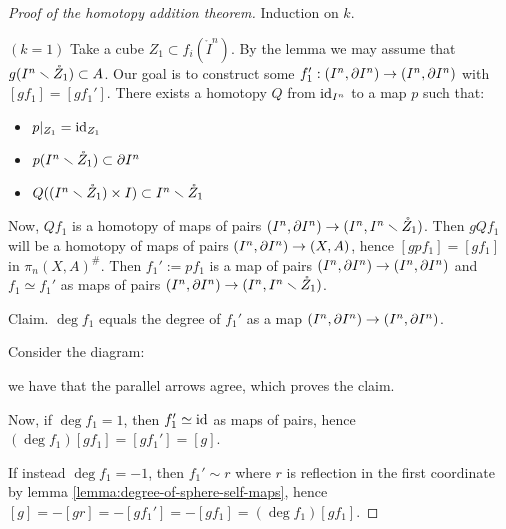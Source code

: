 \begin{proof}[Proof of the homotopy addition theorem]\renewcommand{\qedsymbol}{\textit{To be continued...}} Induction on $k$.

$(k=1)$ Take a cube $Z_1\subset f_i(\mathring{I}^n)$. By the lemma we may assume that $g(I^n\smallsetminus\mathring{Z}_1)\subset A$. Our goal is to construct some $f_1':(I^n,\partial I^n)\to(I^n,\partial I^n)$ with $[gf_1]=[gf_1']$. There exists\normalmarginpar{} a homotopy $Q$ from $\operatorname{id}_{I^n}$ to a map $p$ such that:
\begin{itemize}
    \item $p|_{Z_1}=\operatorname{id}_{Z_1}$
    \item $p(I^n\smallsetminus\mathring{Z}_1)\subset\partial I^n$
    \item $Q((I^n\smallsetminus\mathring{Z}_1)\times I)\subset I^n\smallsetminus \mathring{Z}_1$
\end{itemize}
Now, $Qf_1$ is a homotopy of maps of pairs $(I^n,\partial I^n)\to(I^n,I^n\smallsetminus\mathring{Z}_1)$. Then $gQf_1$ will be a homotopy of maps of pairs $(I^n,\partial I^n)\to(X,A)$, hence $[gpf_1]=[gf_1]$ in $\pi_n(X,A)^\#$. Then $f_1':= pf_1$ is a map of pairs $(I^n,\partial I^n)\to(I^n,\partial I^n)$ and $f_1\simeq f_1'$ as maps of pairs $(I^n,\partial I^n)\to(I^n,I^n\smallsetminus \mathring{Z}_1)$.

Claim.\reversemarginpar{} $\deg f_1$ equals the degree of $f_1'$ as a map $(I^n,\partial I^n)\to(I^n,\partial I^n)$.

\begin{claimproof}
Consider the diagram:
\begin{center}
\end{center}
we have that the parallel arrows agree, which proves the claim.
\end{claimproof}

Now, if $\deg f_1=1$, then $f_1'\simeq\operatorname{id}$ as maps of pairs, hence $(\deg f_1)[gf_1]=[gf_1']=[g]$.

If instead $\deg f_1=-1$, then $f_1'\sim r$ where $r$ is reflection in the first coordinate by lemma \ref{lemma:degree-of-sphere-self-maps}, hence $[g]=-[gr]=-[gf_1']=-[gf_1]=(\deg f_1)[gf_1]$.

\end{proof}
